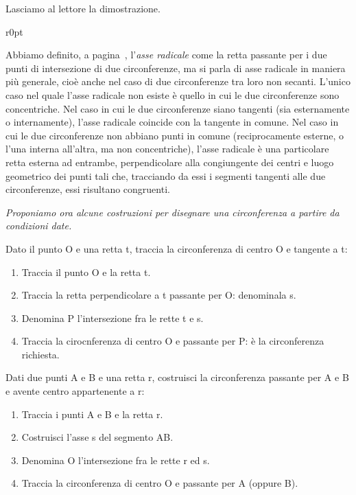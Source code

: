 Lasciamo al lettore la dimostrazione.\\

\begin{wrapfigure}{r}{0pt}
  \centering
\end{wrapfigure}
Abbiamo definito, a pagina~\pageref{def:asse_radicale}, l'\emph{asse 
radicale} come la retta passante per i due punti di intersezione di 
due circonferenze, ma si parla di asse radicale in maniera più 
generale, cioè anche nel caso di due circonferenze tra loro non 
secanti. L'unico caso nel quale l'asse radicale non esiste è quello 
in cui le due circonferenze sono concentriche.
Nel caso in cui le due circonferenze siano tangenti (sia esternamente 
o internamente), l'asse radicale coincide con la tangente in comune.
Nel caso in cui le due circonferenze non abbiano punti in comune 
(reciprocamente esterne, o l'una interna all'altra, ma non 
concentriche), l'asse radicale è una particolare retta esterna ad 
entrambe, perpendicolare alla congiungente dei centri e luogo 
geometrico dei punti tali che, tracciando da essi i segmenti tangenti 
alle due circonferenze, essi risultano congruenti.

\textit{Proponiamo ora alcune costruzioni per disegnare una circonferenza a 
partire da condizioni date.}

\begin{procedura}
  Dato il punto O e una retta t, traccia la circonferenza di centro O e 
tangente a t:
  \begin{enumerate} [nosep]
    \item 
    Traccia il punto O e la retta t.
    \item 
    Traccia la retta perpendicolare a t passante per O: denominala 
s.
    \item
    Denomina P l'intersezione fra le rette t e s.
    \item 
    Traccia la cirocnferenza di centro O e passante per P: è la 
circonferenza richiesta.
  \end{enumerate}
\end{procedura}

\begin{procedura}
  Dati due punti A e B e una retta r, costruisci la circonferenza 
passante per A e B e avente centro appartenente a r:
  \begin{enumerate} [nosep]
    \item 
    Traccia i punti A e B e la retta r.
    \item 
    Costruisci l'asse s del segmento AB.
    \item 
    Denomina O l'intersezione fra le rette r ed s.
    \item 
    Traccia la circonferenza di centro O e passante per A (oppure 
B). 
  \end{enumerate}
\end{procedura}


